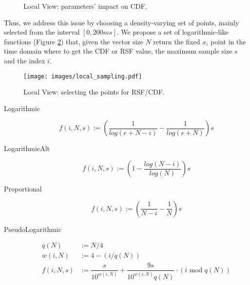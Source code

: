 \begin{figure}[!htbp]
	\centering
	\caption{Local View: parameters' impact on \ac{CDF}.}
	\label{fig:local_impact}
\end{figure}

Thus, we address this issue by choosing a density-varying set of points, mainly selected from the interval $[0,200 ms]$. We propose a set of logarithmic-like functions (Figure \ref{fig:local_sampling}) that, given the vector size $N$ return the fixed $x_i$ point in the time domain where to get the \ac{CDF} or \ac{RSF} value,  the maximum sample size $s$ and the index $i$.

\begin{figure}[!htbp]
	\begin{center}
		\texttt{[image: images/local\_sampling.pdf]}
	\end{center}
	\caption{Local View: selecting the points for \ac{RSF}/\ac{CDF}.}
	\label{fig:local_sampling}
\end{figure}

\begin{description}
	\item[Logarithmic]
		\begin{equation} \label{eqn:nn_log}
			f(i,N,s) := \left(\dfrac{1}{log(e + N - i)} - \dfrac{1}{log(e + N)} \right) s
		\end{equation}
		
	\item[LogarithmicAlt]
		\begin{equation}
			f(i,N,s) := \left(1 - \dfrac{log(N - i)}{log(N)}\right) s
		\end{equation}
	
	\item[Proportional]
		\begin{equation}
			f(i,N,s) := \left(\dfrac{1}{N - i} - \dfrac{1}{N}\right) s
		\end{equation}
		
	\item[PseudoLogarithmic]
		\begin{align}
			q(N) &:= N / 4 \nonumber \\
			w(i,N) &:= 4 - (i / q(N)) \nonumber \\
			f(i,N,s) &:= \dfrac{s}{10^{w(i,N)}} + \dfrac{9 s}{10^{w(i,N)} q(N)} \cdot \left( i \text{ mod } q(N) \right)
		\end{align}
		
\end{description}

